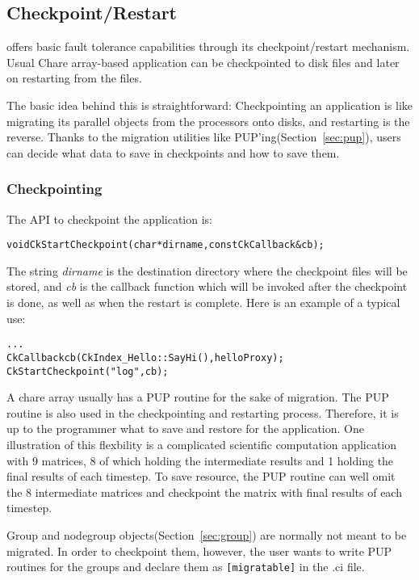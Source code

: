 \subsection{Checkpoint/Restart}
\label{sec:checkpoint}

\charmpp{} offers basic fault tolerance capabilities through its 
checkpoint/restart mechanism. Usual Chare array-based \charmpp{} application 
can be checkpointed to disk files and later on restarting from the files.

The basic idea behind this is straightforward: Checkpointing an 
application is like migrating its parallel objects from the processors
onto disks, and restarting is the reverse. Thanks to the migration 
utilities like PUP'ing(Section~\ref{sec:pup}), users can decide what 
data to save in checkpoints and how to save them.

\subsubsection{Checkpointing}
	The API to checkpoint the application is:

\begin{alltt} 
  void CkStartCheckpoint(char* dirname,const CkCallback& cb);
\end{alltt}

The string {\it dirname} is the destination directory where the checkpoint
files will be stored, and {\it cb} is the callback function which will be
invoked after the checkpoint is done, as well as when the restart is
complete. Here is an example of a typical use:

\begin{alltt} 
  . . .
  CkCallback cb(CkIndex_Hello::SayHi(),helloProxy);
  CkStartCheckpoint("log",cb);
\end{alltt}

A chare array usually has a PUP routine for the sake of migration. 
The PUP routine is also used in the checkpointing and restarting process.
Therefore, it is up to the programmer what to save and restore for
the application. One illustration of this flexbility is a complicated
scientific computation application with 9 matrices, 8 of which holding 
the intermediate results and 1 holding the final results of each timestep.
To save resource, the PUP routine can well omit the 8 intermediate matrices
and checkpoint the matrix with final results of each timestep. 

Group and nodegroup objects(Section~\ref{sec:group}) are normally not 
meant to be migrated. In order to checkpoint them, however, the user 
wants to write PUP routines for the groups and declare them as 
{\tt [migratable]} in the .ci file.

